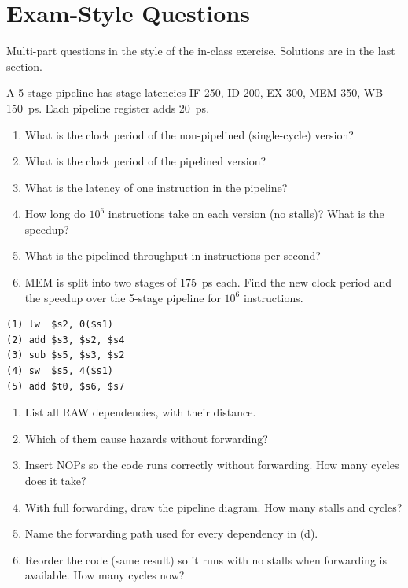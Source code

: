 \documentclass[11pt]{article}
\begin{document}
\section{Exam-Style Questions}

Multi-part questions in the style of the in-class exercise. Solutions are in
the last section.

\begin{exercise}\label{x:timing}
A 5-stage pipeline has stage latencies IF 250, ID 200, EX 300, MEM 350,
WB 150~ps. Each pipeline register adds 20~ps.
\begin{enumerate}[label=(\alph*),leftmargin=*]
  \item What is the clock period of the non-pipelined (single-cycle) version?
  \item What is the clock period of the pipelined version?
  \item What is the latency of one instruction in the pipeline?
  \item How long do $10^6$ instructions take on each version (no stalls)?
  What is the speedup?
  \item What is the pipelined throughput in instructions per second?
  \item MEM is split into two stages of 175~ps each. Find the new clock period
  and the speedup over the 5-stage pipeline for $10^6$ instructions.
\end{enumerate}
\end{exercise}

\begin{exercise}\label{x:hazards}
\leavevmode
\begin{lstlisting}
(1) lw  $s2, 0($s1)
(2) add $s3, $s2, $s4
(3) sub $s5, $s3, $s2
(4) sw  $s5, 4($s1)
(5) add $t0, $s6, $s7
\end{lstlisting}
\begin{enumerate}[label=(\alph*),leftmargin=*]
  \item List all RAW dependencies, with their distance.
  \item Which of them cause hazards without forwarding?
  \item Insert NOPs so the code runs correctly without forwarding. How many
  cycles does it take?
  \item With full forwarding, draw the pipeline diagram. How many stalls and
  cycles?
  \item Name the forwarding path used for every dependency in (d).
  \item Reorder the code (same result) so it runs with no stalls when
  forwarding is available. How many cycles now?
\end{enumerate}
\end{exercise}
\end{document}
